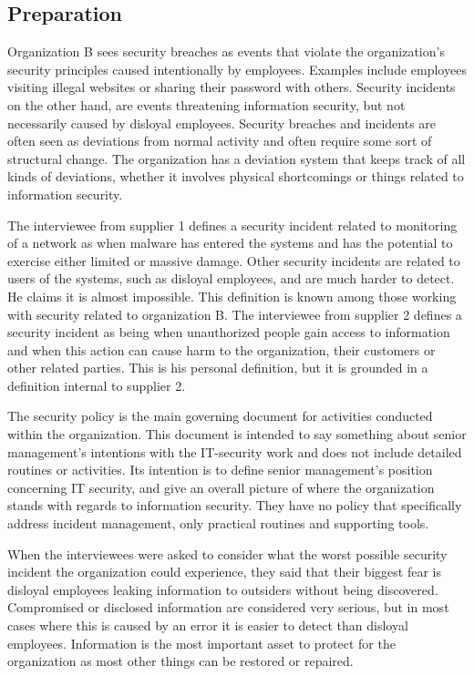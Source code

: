 \subsection{Preparation}
Organization B sees security breaches as events that violate the organization's security principles caused intentionally by employees. Examples include employees visiting illegal websites or sharing their password with others. Security incidents on the other hand, are events threatening information security, but not necessarily caused by disloyal employees. Security breaches and incidents are often seen as deviations from normal activity and often require some sort of structural change. The organization has a deviation system that keeps track of all kinds of deviations, whether it involves physical shortcomings or things related to information security.

The interviewee from supplier 1 defines a security incident related to monitoring of a network as when malware has entered the systems and has the potential to exercise either limited or massive damage. Other security incidents are related to users of the systems, such as disloyal employees, and are much harder to detect. He claims it is almost impossible. This definition is known among those working with security related to organization B. The interviewee from supplier 2 defines a security incident as being when unauthorized people gain access to information and when this action can cause harm to the organization, their customers or other related parties. This is his personal definition, but it is grounded in a definition internal to supplier 2.

The security policy is the main governing document for activities conducted within the organization. This document is intended to say something about senior management's intentions with the IT-security work and does not include detailed routines or activities. Its intention is to define senior management's position concerning IT security, and give an overall picture of where the organization stands with regards to information security. They have no policy that specifically address incident management, only practical routines and supporting tools.

When the interviewees were asked to consider what the worst possible security incident the organization could experience, they said that their biggest fear is disloyal employees leaking information to outsiders without being discovered. Compromised or disclosed information are considered very serious, but in most cases where this is caused by an error it is easier to detect than disloyal employees. Information is the most important asset to protect for the organization as most other things can be restored or repaired.

